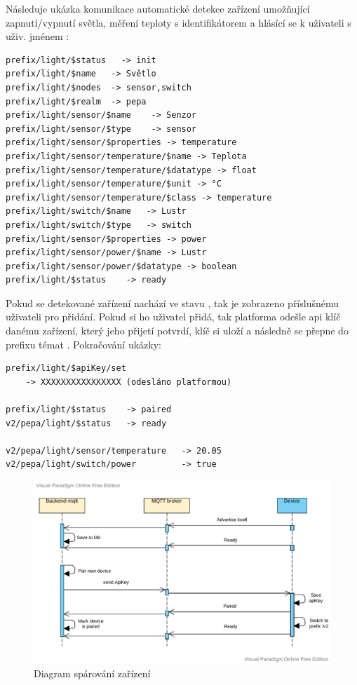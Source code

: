 Následuje ukázka komunikace automatické detekce zařízení umožňující zapnutí/vypnutí světla, měření teploty s identifikátorem  a hlásící se k uživateli s uživ. jménem :
\begin{verbatim}
prefix/light/$status   -> init
prefix/light/$name   -> Světlo
prefix/light/$nodes  -> sensor,switch
prefix/light/$realm  -> pepa
prefix/light/sensor/$name    -> Senzor
prefix/light/sensor/$type    -> sensor
prefix/light/sensor/$properties -> temperature
prefix/light/sensor/temperature/$name -> Teplota
prefix/light/sensor/temperature/$datatype -> float
prefix/light/sensor/temperature/$unit -> °C
prefix/light/sensor/temperature/$class -> temperature
prefix/light/switch/$name   -> Lustr
prefix/light/switch/$type   -> switch
prefix/light/sensor/$properties -> power
prefix/light/sensor/power/$name -> Lustr
prefix/light/sensor/power/$datatype -> boolean
prefix/light/$status    -> ready
\end{verbatim}

Pokud se detekované zařízení nachází ve stavu , tak je zobrazeno příslušnému uživateli pro přidání. Pokud si ho uživatel přidá, tak platforma odešle api klíč danému zařízení, který jeho přijetí potvrdí, klíč si uloží a následně se přepne do prefixu témat . Pokračování ukázky:

\begin{verbatim}
prefix/light/$apiKey/set
    -> XXXXXXXXXXXXXXXX (odesláno platformou)

prefix/light/$status    -> paired
v2/pepa/light/$status   -> ready

v2/pepa/light/sensor/temperature   -> 20.05
v2/pepa/light/switch/power         -> true
\end{verbatim}

\begin{figure}[htbp]
    \centering
    \includegraphics[width=\textwidth]{img/communication_part1.pdf}
    \caption{Diagram spárování zařízení}
\end{figure}
